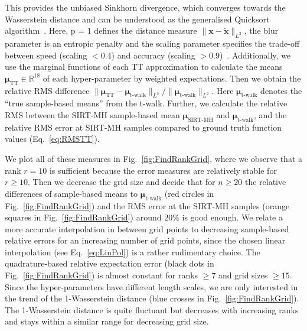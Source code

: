 This provides the unbiased Sinkhorn divergence, which converges towards the Wasserstein distance and can be understood as the generalised Quicksort algorithm~\cite{feydy2020OT}.
Here, p = 1 defines the distance measure $\lVert \bm{x} -\tilde{\bm{x}} \rVert_{L^2}$, the blur parameter is an entropic penalty and the scaling parameter specifies the trade-off between speed (scaling $< 0.4$) and accuracy (scaling $>0.9$)~\cite{Wassersteinaccess}.
Additionally, we use the marginal functions of each TT approximation to calculate the means $\bm{\mu}_{\text{TT}} \in \mathbb{R}^{18}$ of each hyper-parameter by weighted expectations.
Then we obtain the relative RMS difference $\lVert\bm{\mu}_{\text{TT}} - \bm{\mu}_{\text{t-walk}} \rVert_{L^2} / \lVert \bm{\mu}_{\text{t-walk}} \rVert_{L^2} $.
Here $\bm{\mu}_{\text{t-walk}}$ denotes the ``true sample-based means'' from the t-walk.
Further, we calculate the relative RMS between the SIRT-MH sample-based mean $\bm{\mu}_{\text{SIRT-MH}}$ and $\bm{\mu}_{\text{t-walk}}$, and the relative RMS error at SIRT-MH samples compared to ground truth function values (Eq.~\ref{eq:RMSTT}).

We plot all of these measures in Fig.~\ref{fig:FindRankGrid}, where we observe that a rank $r = 10$ is sufficient because the error measures are relatively stable for $r\geq10$.
Then we decrease the grid size and decide that for $n \geq 20$ the relative differences of sample-based means to $\bm{\mu}_{\text{t-walk}}$ (red circles in Fig.~\ref{fig:FindRankGrid}) and the RMS error at the SIRT-MH samples (orange squares in Fig.~\ref{fig:FindRankGrid}) around $ 20\%$ is good enough.
We relate a more accurate interpolation in between grid points to decreasing sample-based relative errors for an increasing number of grid points, since the chosen linear interpolation (see Eq.~\ref{eq:LinPol}) is a rather rudimentary choice.
The quadrature-based relative expectation error (black dots in Fig.~\ref{fig:FindRankGrid}) is almost constant for ranks $\geq 7$ and grid sizes $\geq15$.
Since the hyper-parameters have different length scales, we are only interested in the trend of the 1-Wasserstein distance (blue crosses in Fig.~\ref{fig:FindRankGrid}).
The 1-Wasserstein distance is quite fluctuant but decreases with increasing ranks and stays within a similar range for decreasing grid size.


